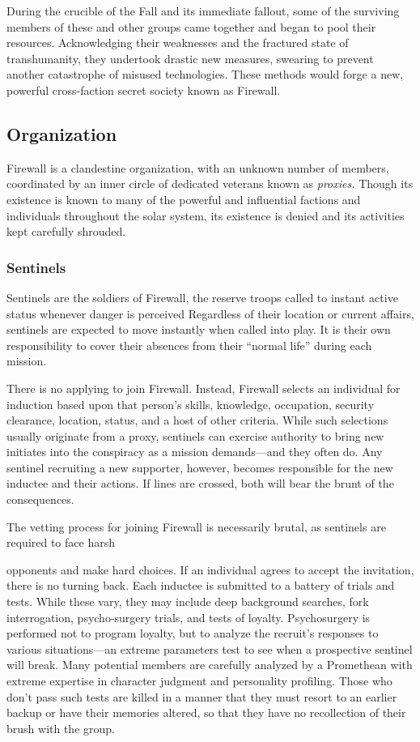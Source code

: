During the crucible of the Fall and its immediate fallout, some of the surviving members of these and other groups came together and began to pool their resources. Acknowledging their weaknesses and the fractured state of transhumanity, they undertook drastic new measures, swearing to prevent another catastrophe of misused technologies. These methods would forge a new, powerful cross-faction secret society known as Firewall. 

\subsection{Organization } 

Firewall is a clandestine organization, with an unknown number of members, coordinated by an inner circle of dedicated veterans known as \textit{proxies.} Though its existence is known to many of the powerful and influential factions and individuals throughout the solar system, its existence is denied and its activities kept carefully shrouded. 

\subsubsection{Sentinels} 

Sentinels are the soldiers of Firewall, the reserve troops called to instant active status whenever danger is perceived Regardless of their location or current affairs, sentinels are expected to move instantly when called into play. It is their own responsibility to cover their absences from their ``normal life'' during each mission. 

There is no applying to join Firewall. Instead, Firewall selects an individual for induction based upon that person's skills, knowledge, occupation, security clearance, location, status, and a host of other criteria. While such selections usually originate from a proxy, sentinels can exercise authority to bring new initiates into the conspiracy as a mission demands—and they often do. Any sentinel recruiting a new supporter, however, becomes responsible for the new inductee and their actions. If lines are crossed, both will bear the brunt of the consequences. 

The vetting process for joining Firewall is necessarily brutal, as sentinels are required to face harsh 

opponents and make hard choices. If an individual agrees to accept the invitation, there is no turning back. Each inductee is submitted to a battery of trials and tests. While these vary, they may include deep background searches, fork interrogation, psycho-surgery trials, and tests of loyalty. Psychosurgery is performed not to program loyalty, but to analyze the recruit's responses to various situations—an extreme parameters test to see when a prospective sentinel will break. Many potential members are carefully analyzed by a Promethean with extreme expertise in character judgment and personality profiling. Those who don't pass such tests are killed in a manner that they must resort to an earlier backup or have their memories altered, so that they have no recollection of their brush with the group. 


